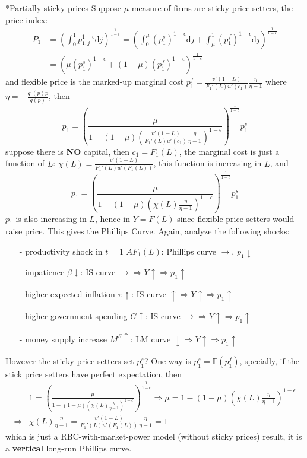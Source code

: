 \documentclass[10pt,landscape,a4paper]{article}
\makeatletter
\renewcommand{\subsubsection}{\@startsection{subsubsection}{1}{0mm}{.2ex}{.2ex}{\bfseries}}
\makeatother
\begin{document}
\begin{multicols*}{3}
\subsubsection*{Partially sticky prices}
Suppose $\mu$ measure of firms are sticky-price setters, the price index:
\begin{align*}
    P_1 &= \left(\int_0^1 p_{1,j}^{1-\epsilon}\mathrm{d}j\right)^{\frac{1}{1-\epsilon}} = \left( \int_0^{\mu}(p^s_1)^{1-\epsilon}\mathrm{d}j + \int_{\mu}^1(p^f_1)^{1-\epsilon}\mathrm{d}j \right)^{\frac{1}{1-\epsilon}} \\
    &= \left(\mu (p_1^s)^{1-\epsilon} + (1-\mu)(p_1^f)^{1-\epsilon}\right)^{\frac{1}{1-\epsilon}}
\end{align*}
and flexible price is the marked-up marginal cost $p_1^f = \frac{v'(1-L)}{F_1'(L)u'(c_1)}\frac{\eta}{\eta-1}$ where $\eta = -\frac{q'(p)p}{q(p)}$, then
$$
p_1 = \left(\frac{\mu}{1-(1-\mu)\left(\frac{v'(1-L)}{F_1'(L)u'(c_1)}\frac{\eta}{\eta-1}\right)^{1-\epsilon}}\right)^{\frac{1}{1-\epsilon}}p_1^s
$$
suppose there is \textbf{NO} capital, then $c_1=F_1(L)$, the marginal cost is just a function of $L$: $\chi(L)=\frac{v'(1-L)}{F_1'(L)u'(F_1(L))}$, this function is increasing in $L$, and 
$$
p_1 = \left(\frac{\mu}{1-(1-\mu)\left(\chi(L)\frac{\eta}{\eta-1}\right)^{1-\epsilon}}\right)^{\frac{1}{1-\epsilon}}p_1^s
$$
$p_1$ is also increasing in $L$, hence in $Y=F(L)$ since flexible price setters would raise price. This gives the Phillips Curve. Again, analyze the following shocks:
\begin{itemize}
    \item[-] productivity shock in $t=1$ $AF_1(L)$: Phillips curve $\rightarrow$, $p_1\downarrow$
    \item[-] impatience $\beta \downarrow$: IS curve $\rightarrow\Rightarrow Y\uparrow \Rightarrow p_1\uparrow$
    \item[-] higher expected inflation $\pi \uparrow$: IS curve $\uparrow \Rightarrow Y\uparrow \Rightarrow p_1\uparrow$
    \item[-] higher government spending $G\uparrow$: IS curve $\rightarrow \Rightarrow Y\uparrow \Rightarrow p_1\uparrow$
    \item[-] money supply increase $M^S \uparrow$: LM curve $\downarrow \Rightarrow Y\uparrow \Rightarrow p_1\uparrow$
\end{itemize}

However the sticky-price setters set $p_1^s$? One way is $p_1^s = \mathbb{E}(p_1^f)$, specially, if the stick price setters have perfect expectation, then
\begin{align*}
   & 1 = \left(\frac{\mu}{1-(1-\mu)\left(\chi(L)\frac{\eta}{\eta-1}\right)^{1-\epsilon}}\right)^{\frac{1}{1-\epsilon}} \Rightarrow \mu = 1-(1-\mu)\left(\chi(L)\frac{\eta}{\eta-1}\right)^{1-\epsilon}\\
    \Rightarrow &\chi(L)\frac{\eta}{\eta-1} = \frac{v'(1-L)}{F_1'(L)u'(F_1(L))}\frac{\eta}{\eta-1}=1
\end{align*}
which is just a RBC-with-market-power model (without sticky prices) result, it is a \textbf{vertical} long-run Phillips curve.


\end{multicols*}
\end{document}
